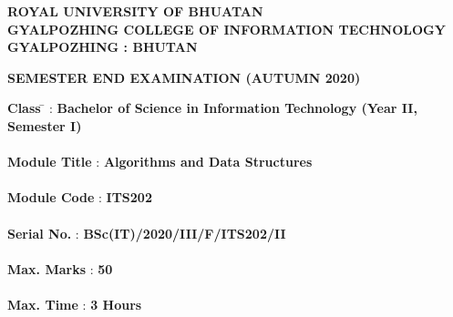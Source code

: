 \documentclass[12pt ,a4paper]{exam}
\author{Yonten Jamtsho}
\begin{document}
	\begin{center}
		\textbf{ROYAL UNIVERSITY OF BHUATAN} \\
		\textbf{GYALPOZHING COLLEGE OF INFORMATION TECHNOLOGY} \\
		\textbf{GYALPOZHING : BHUTAN}
	\end{center}
	
	\vspace{0.2cm}
	
	\begin{center}
		\textbf{SEMESTER END EXAMINATION (AUTUMN 2020)}
	\end{center}
	
	\vspace{0.1cm}
	
	\begin{tabbing}
		\textbf{Class} \=  \hspace{2cm} :  \hspace{0.3cm} \textbf{Bachelor of Science in Information Technology (Year II, Semester I)}     \\ \\
		
		\textbf{Module Title} \hspace{0.65cm} : \hspace{0.3cm} \textbf{Algorithms and Data Structures}       \\ \\
		
		\textbf{Module Code} \hspace{0.55cm} :     \hspace{0.3cm} \textbf{ITS202}     \\ \\
		
		\textbf{Serial No.} \hspace{1.13cm} :       \hspace{0.3cm} \textbf{BSc(IT)/2020/III/F/ITS202/II}          \\ \\
		
		\textbf{Max. Marks} \hspace{0.75cm} :     \hspace{0.3cm} \textbf{50}             \\ \\
		
		\textbf{Max. Time} \hspace{1.04cm} :        \hspace{0.3cm} \textbf{3 Hours}             \\ \\
	\end{tabbing}
	
\end{document}
